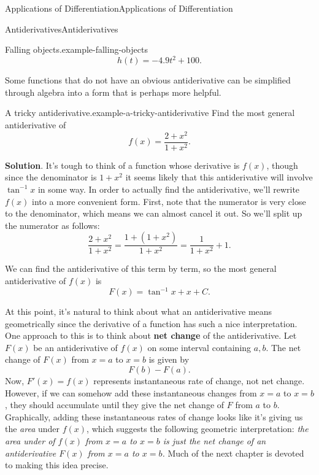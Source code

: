 \documentclass[10pt,]{book}
\newcommand{\terminology}[1]{\textbf{#1}}
\numberwithin{equation}{section}
\begin{document}
\begin{chapterptx}{Applications of Differentiation}{}{Applications of Differentiation}{}{}
\begin{sectionptx}{Antiderivatives}{}{Antiderivatives}{}{}
\begin{example}{Falling objects.}{example-falling-objects}
\begin{equation*}
h(t) = -4.9t^{2} + 100\text{.}
\end{equation*}
%
\end{example}
\hypertarget{p-396}{}%
Some functions that do not have an obvious antiderivative can be simplified through algebra into a form that is perhaps more helpful.%
\begin{example}{A tricky antiderivative.}{example-a-tricky-antiderivative}%
\hypertarget{p-397}{}%
Find the most general antiderivative of%
\begin{equation*}
f(x) = \frac{2+x^{2}}{1+x^{2}}.
\end{equation*}
%
\par\smallskip%
\noindent\textbf{Solution}.\hypertarget{solution-89}{}\quad%
\hypertarget{p-398}{}%
It's tough to think of a function whose derivative is \(f(x)\), though since the denominator is \(1+x^{2}\) it seems likely that this antiderivative will involve \(\tan^{-1}x\) in some way. In order to actually find the antiderivative, we'll rewrite \(f(x)\) into a more convenient form. First, note that the numerator is very close to the denominator, which means we can almost cancel it out. So we'll split up the numerator as follows:%
\begin{equation*}
\frac{2+x^{2}}{1+x^{2}} = \frac{1+(1+x^{2})}{1+x^{2}} = \frac{1}{1+x^{2}} + 1.
\end{equation*}
%
\par
\hypertarget{p-399}{}%
We can find the antiderivative of this term by term, so the most general antiderivative of \(f(x)\) is%
\begin{equation*}
F(x) = \tan^{-1}x + x + C.
\end{equation*}
%
\end{example}
\hypertarget{p-400}{}%
At this point, it's natural to think about what an antiderivative means geometrically since the derivative of a function has such a nice interpretation. One approach to this is to think about \terminology{net change} of the antiderivative. Let \(F(x)\) be an antiderivative of \(f(x)\) on some interval containing \(a,b\). The net change of \(F(x)\) from \(x=a\) to \(x=b\) is given by%
\begin{equation*}
F(b) - F(a).
\end{equation*}
Now, \(F'(x) = f(x)\) represents instantaneous rate of change, not net change. However, if we can somehow add these instantaneous changes from \(x=a\) to \(x=b\), they should accumulate until they give the net change of \(F\) from \(a\) to \(b\). Graphically, adding these instantaneous rates of change looks like it's giving us the \emph{area} under \(f(x)\), which suggests the following geometric interpretation: \emph{the area under of \(f(x)\) from \(x=a\) to \(x=b\) is just the net change of an antiderivative \(F(x)\) from \(x=a\) to \(x=b\).} Much of the next chapter is devoted to making this idea precise.%
\end{sectionptx}
\end{chapterptx}
\end{document}

